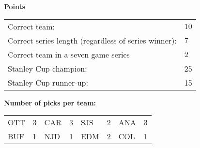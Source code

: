 \documentclass[10pt]{article}
\begin{document}
\begin{table}[!htb]
\begin{minipage}[t]{.27\linewidth}
{\bf Points}\\
\begin{tabular}{l l}
    Correct team:	& $10$\\
    Correct series length (regardless of series winner):	& $7$\\
    Correct team in a seven game series    & $2$\\
    Stanley Cup champion:	& 25\\
    Stanley Cup runner-up:	& 15\\
\end{tabular}
\end{minipage}
\hspace{0.5cm}
\begin{minipage}[t]{.45\linewidth}
{\bf Number of picks per team:}\\
\begin{tabular}{lc | lc | lc | lc }
    OTT & 3 & CAR & 3 & SJS & 2 & ANA & 3 \\
    BUF & 1 & NJD & 1 & EDM & 2 & COL & 1 \\
\end{tabular}
\end{minipage}
\end{table}
\end{document}
